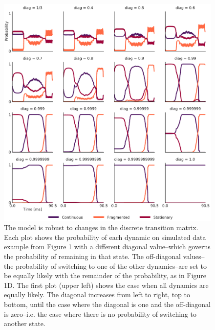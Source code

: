 \documentclass[times, twoside]{zHenriquesLab-StyleBioRxiv}
\begin{document}
\begin{figure}%
\centering
\includegraphics[width=0.80\linewidth]{figures/Figure1-supplemental1/Figure1_v2_supplemental1}
\caption{The model is robust to changes in the discrete transition matrix. Each plot shows the probability of each dynamic on simulated data example from Figure 1 with a different diagonal value--which governs the probability of remaining in that state. The off-diagonal values--the probability of switching to one of the other dynamics--are set to be equally likely with the remainder of the probability, as in Figure 1D. The first plot (upper left) shows the case when all dynamics are equally likely. The diagonal increases from left to right, top to bottom, until the case where the diagonal is one and the off-diagonal is zero--i.e. the case where there is no probability of switching to another state.}
\label{fig:Figure1-Figure supplement 1}
\end{figure}
\end{document}
